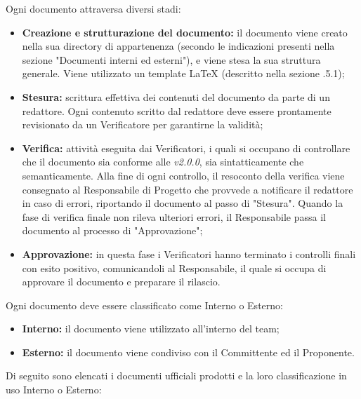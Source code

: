       Ogni documento attraversa diversi stadi:
      \begin{itemize}
        \item \textbf{Creazione e strutturazione del documento:} il documento viene creato nella sua directory di appartenenza (secondo le indicazioni presenti nella sezione "Documenti interni ed esterni"), e viene stesa la sua struttura generale. Viene utilizzato un template \LaTeX{} (descritto nella sezione .5.1);
        \item \textbf{Stesura:} scrittura effettiva dei contenuti del documento da parte di un redattore. Ogni contenuto scritto dal redattore deve essere prontamente revisionato da un Verificatore per garantirne la validità;
        \item \textbf{Verifica:} attività eseguita dai Verificatori, i quali si occupano di controllare che il documento sia conforme alle \textit{\NdP{} v2.0.0}, sia sintatticamente che semanticamente. Alla fine di ogni controllo, il resoconto della verifica viene consegnato al Responsabile di Progetto che provvede a notificare il redattore in caso di errori, riportando il documento al passo di "Stesura". Quando la fase di verifica finale non rileva ulteriori errori, il Responsabile passa il documento al processo di "Approvazione";
        \item \textbf{Approvazione:} in questa fase i Verificatori hanno terminato i controlli finali con esito positivo, comunicandoli al Responsabile, il quale si occupa di approvare il documento e preparare il rilascio.
      \end{itemize}
  	Ogni documento deve essere classificato come Interno o Esterno:
  	\begin{itemize}
  		\item \textbf{Interno:} il documento viene utilizzato all'interno del team;
  		\item \textbf{Esterno:} il documento viene condiviso con il Committente ed il Proponente.
  	\end{itemize}
	Di seguito sono elencati i documenti ufficiali prodotti e la loro classificazione in uso Interno o Esterno:
